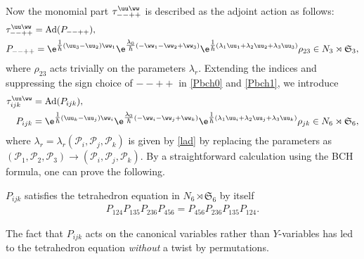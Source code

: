 Now the monomial part $\tau^{\uu\ww}_{--++}$
is described as the adjoint action as follows:
\begin{align}
&\tau^{\uu\ww}_{--++} = \mathrm{Ad}(P_{--++}),
\label{Pbch0}\\
&P_{--++}=
\e^{\tfrac{1}{\hbar}(\uu_3-\uu_2)\ww_1}
\e^{\tfrac{\lambda_0}{\hbar}(-\ww_1-\ww_2+\ww_3)}
\e^{\tfrac{1}{\hbar}(\lambda_1\uu_1+\lambda_2\uu_2+\lambda_3\uu_3)}\rho_{23}
\in N_3 \rtimes \mathfrak{S}_3,
\label{Pbch1}
\end{align}
where $\rho_{23}$ acts trivially on the parameters $\lambda_r$.
%
Extending the indices and suppressing the sign choice of $--++$ in \eqref{Pbch0} and \eqref{Pbch1}, we introduce
\begin{align}
\tau^{\uu\ww}_{ijk} &= \mathrm{Ad}(P_{ijk}),
\label{tijk}\\
P_{ijk} &=
\e^{\tfrac{1}{\hbar}(\uu_k-\uu_j)\ww_i}
\e^{\tfrac{\lambda_0}{\hbar}(-\ww_i-\ww_j+\ww_k)}
\e^{\tfrac{1}{\hbar}(\lambda_1\uu_i+\lambda_2\uu_j+\lambda_3\uu_k)}\rho_{jk}
\in N_6 \rtimes \mathfrak{S}_6,
\label{pijk}
\end{align}
where $\lambda_r=\lambda_r(\mathscr{P}_i, \mathscr{P}_j, \mathscr{P}_k)$ is given by
\eqref{lad} by replacing the parameters as
$(\mathscr{P}_1 ,\mathscr{P}_2 ,\mathscr{P}_3) \rightarrow
(\mathscr{P}_i ,\mathscr{P}_j ,\mathscr{P}_k)$.
%
By a straightforward calculation using the BCH formula, one can prove the following.
\begin{Lemma}\label{le:tep}
$P_{ijk}$ satisfies the tetrahedron equation in $N_6 \rtimes \mathfrak{S}_6$ by itself
\begin{align}\label{pte}
P_{124}P_{135}P_{236}P_{456} =
P_{456}P_{236}P_{135}P_{124}.
\end{align}
\end{Lemma}
The fact that $P_{ijk}$ acts on the canonical variables rather than $Y$-variables
has led to the tetrahedron equation {\em without} a twist by permutations.

